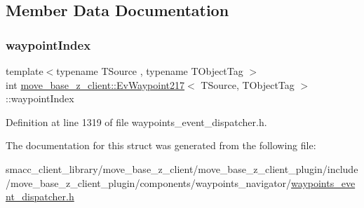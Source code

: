 \subsection{Member Data Documentation}
\mbox{\label{structmove__base__z__client_1_1EvWaypoint217_af261221b3697b52db5b6a593f2b84e83}} 
\subsubsection{\texorpdfstring{waypoint\+Index}{waypointIndex}}
{\footnotesize\ttfamily template$<$typename T\+Source , typename T\+Object\+Tag $>$ \\
int \hyperlink{structmove__base__z__client_1_1EvWaypoint217}{move\+\_\+base\+\_\+z\+\_\+client\+::\+Ev\+Waypoint217}$<$ T\+Source, T\+Object\+Tag $>$\+::waypoint\+Index}



Definition at line 1319 of file waypoints\+\_\+event\+\_\+dispatcher.\+h.



The documentation for this struct was generated from the following file\+:\begin{DoxyCompactItemize}
\item 
smacc\+\_\+client\+\_\+library/move\+\_\+base\+\_\+z\+\_\+client/move\+\_\+base\+\_\+z\+\_\+client\+\_\+plugin/include/move\+\_\+base\+\_\+z\+\_\+client\+\_\+plugin/components/waypoints\+\_\+navigator/\hyperlink{waypoints__event__dispatcher_8h}{waypoints\+\_\+event\+\_\+dispatcher.\+h}\end{DoxyCompactItemize}
